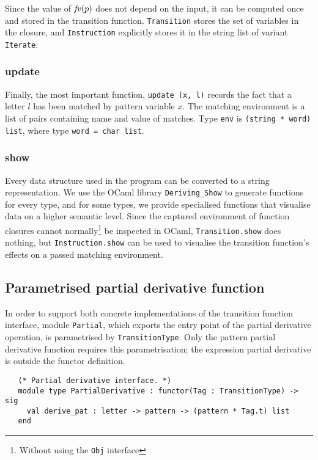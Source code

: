 Since the value of $\mathit{fv}(p)$ does not depend on the input, it can be computed
once and stored in the transition function. \texttt{Transition} stores the set
of variables in the closure, and \texttt{Instruction} explicitly stores it in
the string list of variant \texttt{Iterate}.

\subsubsection{update}

Finally, the most important function, \texttt{update (x, l)} records the fact
that a letter $l$ has been matched by pattern variable $x$. The matching
environment is a list of pairs containing name and value of matches. Type
\texttt{env} is \texttt{(string * word) list}, where type \texttt{word = char
list}.

\subsubsection{show}

Every data structure used in the program can be converted to a string
representation. We use the OCaml library \texttt{Deriving\_Show} to generate
functions for every type, and for some types, we provide specialised functions
that visualise data on a higher semantic level. Since the captured environment
of function closures cannot normally\footnote{Without using the \texttt{Obj}
interface} be inspected in OCaml, \texttt{Transition.show} does nothing, but
\texttt{Instruction.show} can be used to visualise the transition function's
effects on a passed matching environment.

\subsection{Parametrised partial derivative function}

In order to support both concrete implementations of the transition function
interface, module \texttt{Partial}, which exports the entry point of the partial
derivative operation, is parametrised by \texttt{TransitionType}. Only the
pattern partial derivative function requires this parametrisation; the
expression partial derivative is outside the functor definition.

\begin{lstlisting}
   (* Partial derivative interface. *)
   module type PartialDerivative : functor(Tag : TransitionType) -> sig
     val derive_pat : letter -> pattern -> (pattern * Tag.t) list
   end
\end{lstlisting}


